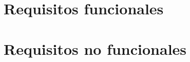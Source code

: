 \section{Requisitos funcionales}

\newline


\newline

\newline

\newline

\newline

\newline

\newline

\newline

\newline

\newline

\newline

\newline

\newline

\newline

\newline

\newline

\newline

\section{Requisitos no funcionales}